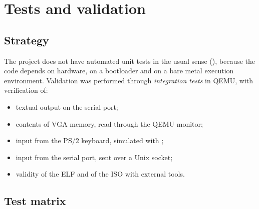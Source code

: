 \chapter{Tests and validation}
\label{cap:testes}

\section{Strategy}

The project does not have automated unit tests in the usual sense
(), because the code depends on hardware, on a bootloader
and on a bare metal execution environment. Validation was performed through
\emph{integration tests} in QEMU, with verification of:

\begin{itemize}
  \item textual output on the serial port;
  \item contents of VGA memory, read through the QEMU monitor;
  \item input from the PS/2 keyboard, simulated with ;
  \item input from the serial port, sent over a Unix socket;
  \item validity of the ELF and of the ISO with external tools.
\end{itemize}

\section{Test matrix}

